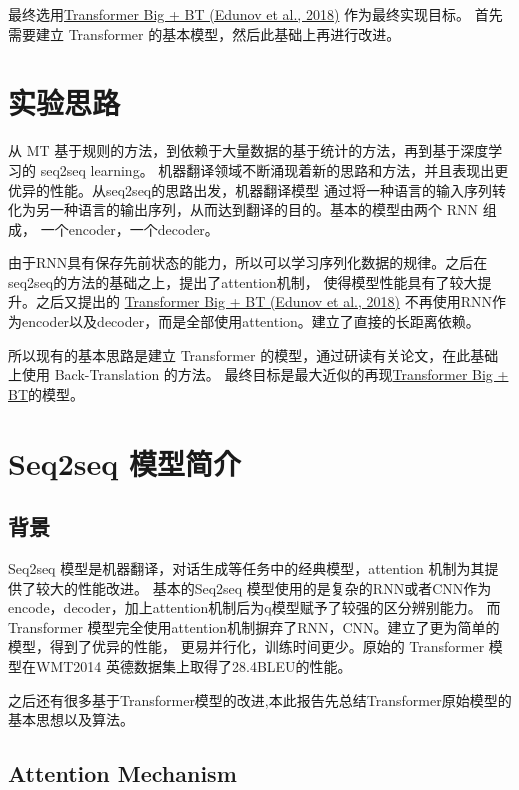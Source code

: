 \documentclass[UTF8,a4paper,10pt]{ctexart}
\begin{document}
  最终选用\href{https://arxiv.org/pdf/1808.09381.pdf}{\color{blue}Transformer Big + BT (Edunov et al., 2018)} 作为最终实现目标。
  首先需要建立 Transformer 的基本模型，然后此基础上再进行改进。


\section{实验思路}

   从 MT 基于规则的方法，到依赖于大量数据的基于统计的方法，再到基于深度学习的 seq2seq learning。
   机器翻译领域不断涌现着新的思路和方法，并且表现出更优异的性能。从seq2seq的思路出发，机器翻译模型
   通过将一种语言的输入序列转化为另一种语言的输出序列，从而达到翻译的目的。基本的模型由两个 RNN 组成，
   一个encoder，一个decoder。
   

   由于RNN具有保存先前状态的能力，所以可以学习序列化数据的规律。之后在seq2seq的方法的基础之上，提出了attention机制，
   使得模型性能具有了较大提升。之后又提出的 \href{https://arxiv.org/pdf/1808.09381.pdf}{\color{blue}Transformer Big + BT (Edunov et al., 2018)} 
   不再使用RNN作为encoder$以及$decoder，而是全部使用attention。建立了直接的长距离依赖。


   所以现有的基本思路是建立 Transformer 的模型，通过研读有关论文，在此基础上使用 Back-Translation 的方法。
   最终目标是最大近似的再现\href{https://arxiv.org/pdf/1808.09381.pdf}{\color{blue}Transformer Big + BT}的模型。

\section{Seq2seq 模型简介} 
\subsection{背景}

   Seq2seq 模型是机器翻译，对话生成等任务中的经典模型，attention 机制为其提供了较大的性能改进。
   基本的Seq2seq 模型使用的是复杂的RNN或者CNN作为encode，decoder，加上attention机制后为q模型赋予了较强的区分辨别能力。
   而 Transformer 模型完全使用attention机制摒弃了RNN，CNN。建立了更为简单的模型，得到了优异的性能，
   更易并行化，训练时间更少。原始的 Transformer 模型在WMT2014 英德数据集上取得了28.4BLEU的性能。

   之后还有很多基于Transformer模型的改进,本此报告先总结Transformer原始模型的基本思想以及算法。

\subsection{Attention Mechanism }
\end{document}
